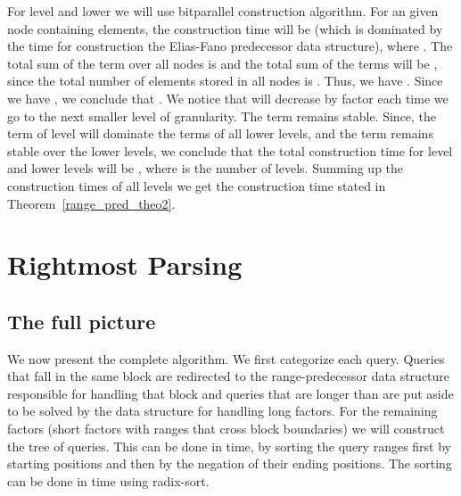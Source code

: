 \documentclass[11pt,runningheads]{llncs}
\begin{document}
{For level  and lower we will use bitparallel construction algorithm. For an given node  containing 
 elements, the construction time will be  (which is dominated by the time for construction the Elias-Fano predecessor data structure), where . The total sum of the  term over all nodes is  and the total sum of the terms 
 will be , since the total
number of elements stored in all nodes is . Thus, we have . Since 
we have , we conclude that . We notice that  will decrease 
by factor  each time we go to the next smaller level of granularity. The term  remains stable. Since, the term  of level  will dominate the terms  of all lower levels, and the term  remains stable over the lower levels, we conclude that the total construction 
time for level  and lower levels will be , where  is the number of levels. 
Summing up the construction times of all levels we get the construction time stated in Theorem~\ref{range_pred_theo2}.


\section{Rightmost Parsing}

\subsection{The full picture}
\label{sec:time_efficient_rightmost}
We now present the complete algorithm. 
We first categorize each query.
Queries that fall in the same block are redirected 
to the range-predecessor data structure responsible 
for handling that block and queries that are longer 
than  are put aside to be solved by the data structure 
for handling long factors. 
For the remaining factors (short factors with ranges 
that cross block boundaries) we will construct the tree of queries. 
This can be done 
in  time, by sorting the query ranges 
first by starting positions and then by the negation
of their ending positions. The sorting can be done 
in  time 
using 
radix-sort. 

}
\end{document}
